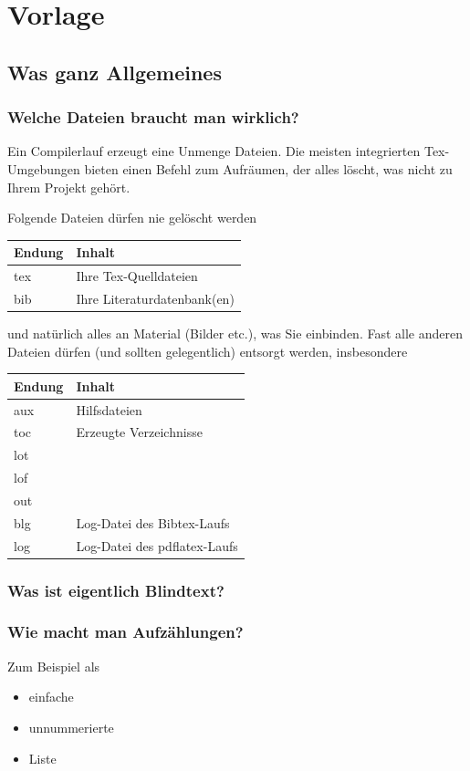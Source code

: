\chapter{Vorlage} 
\section{Was ganz Allgemeines}
\subsection{Welche Dateien braucht man wirklich?}
Ein Compilerlauf erzeugt eine Unmenge Dateien. Die meisten integrierten Tex-Umgebungen bieten einen Befehl zum Aufräumen, der alles löscht, was nicht zu Ihrem Projekt gehört.

Folgende Dateien dürfen nie gelöscht werden

\begin{tabu}{|X[0.5] | X[3] |}
\hline
\rowfont{\bfseries} Endung & Inhalt \\
\hline
tex & Ihre Tex-Quelldateien\\
bib & Ihre Literaturdatenbank(en)\\
\hline
\end{tabu}
und natürlich alles an Material (Bilder etc.), was Sie einbinden. Fast alle anderen Dateien dürfen (und sollten gelegentlich) entsorgt werden, insbesondere

\begin{tabu}{|X[0.5] | X[3] |}
\hline
\rowfont{\bfseries} Endung & Inhalt \\
\hline
aux & Hilfsdateien\\
toc & Erzeugte Verzeichnisse\\
lot & \\
lof & \\
out & \\
blg & Log-Datei des Bibtex-Laufs \\
log & Log-Datei des pdflatex-Laufs\\
\hline
\end{tabu}


\subsection{Was ist eigentlich Blindtext?}

\blindtext
\subsection{Wie macht man Aufzählungen?}
Zum Beispiel als
\begin{itemize}
\item einfache
\item unnummerierte
\item Liste
\end{itemize}

